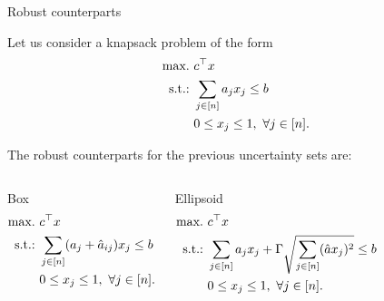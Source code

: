 \begin{frame}{Robust counterparts}

	Let us consider a knapsack problem of the form
	\begin{equation*}
	\begin{aligned}
		\mathop{\text{max.} \ } & c^\top x \\		
		\text{s.t.:~} & \sum_{j \in [n]} a_j x_j \le b \\
		& 0 \le x_j \le 1, \ \forall j \in [n].
	\end{aligned}
	\end{equation*}
	
	\pause
	The \alert{robust counterparts} for the previous uncertainty sets are:
	\begin{columns}
		\begin{block}{Box}
			\vspace{-12pt}
			\begin{equation*}
			\begin{aligned}
				\mathop{\text{max.} \ } & c^\top x \\		
				\mathop{\text{s.t.:} \ } & \sum_{j \in [n]} (a_j + \hat{a}_{ij})x_j \le b \\
				& 0 \le x_j \le 1, \ \forall j \in [n].
			\end{aligned}
			\end{equation*}
		\end{block}
		\begin{block}{Ellipsoid}
			\vspace{-12pt}
			\begin{equation*}
			\begin{aligned}
				\mathop{\text{max.} \ } & c^\top x \\		
				\mathop{\text{s.t.:} \ } & \sum_{j \in [n]} a_j x_j + \Gamma\sqrt{\sum_{j \in [n]} (\hat{a} x_j)^2} \le b \\
				& 0 \le x_j \le 1, \ \forall j \in [n].
			\end{aligned}
			\end{equation*}
		\end{block}
	\end{columns}

\end{frame}


